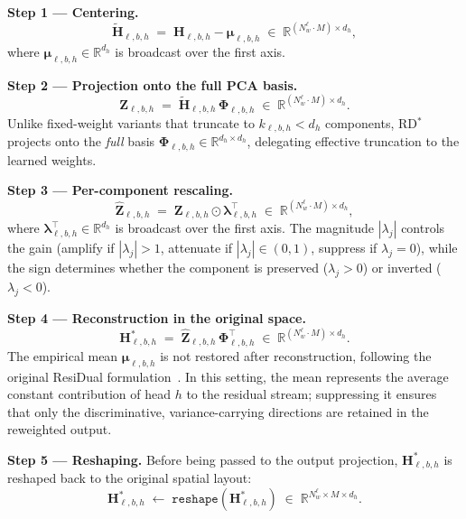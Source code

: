 \textbf{Step 1 — Centering.}
\begin{equation}
    \widetilde{\mathbf{H}}_{\ell,b,h}
\;=\; \mathbf{H}_{\ell,b,h} - \boldsymbol{\mu}_{\ell,b,h}
\;\in\; \mathbb{R}^{(N_w^\ell \cdot M) \times d_h},
\label{eq:rd_reweight-1}
\end{equation}
where $\boldsymbol{\mu}_{\ell,b,h} \in \mathbb{R}^{d_h}$ is broadcast
over the first axis.

\textbf{Step 2 — Projection onto the full PCA basis.}
\begin{equation}
    \mathbf{Z}_{\ell,b,h}
\;=\; \widetilde{\mathbf{H}}_{\ell,b,h}\,\boldsymbol{\Phi}_{\ell,b,h}
\;\in\; \mathbb{R}^{(N_w^\ell \cdot M) \times d_h}.
\label{eq:rd_reweight-2}
\end{equation}
Unlike fixed-weight variants that truncate to $k_{\ell,b,h} < d_h$
components, RD$^*$\xspace projects onto the \emph{full} basis
$\boldsymbol{\Phi}_{\ell,b,h} \in \mathbb{R}^{d_h \times d_h}$,
delegating effective truncation to the learned weights.

\textbf{Step 3 — Per-component rescaling.}
\begin{equation}
    \widehat{\mathbf{Z}}_{\ell,b,h}
\;=\; \mathbf{Z}_{\ell,b,h}
\odot \boldsymbol{\lambda}_{\ell,b,h}^\top
\;\in\; \mathbb{R}^{(N_w^\ell \cdot M) \times d_h},
\label{eq:rd_reweight-3}
\end{equation}
where $\boldsymbol{\lambda}_{\ell,b,h}^\top \in \mathbb{R}^{d_h}$ is
broadcast over the first axis. The magnitude $|\lambda_j|$ controls the gain (amplify if $|\lambda_j|>1$, 
attenuate if $|\lambda_j|\in(0,1)$, suppress if $\lambda_j=0$), while the 
sign determines whether the component is preserved ($\lambda_j>0$) or 
inverted ($\lambda_j<0$).

\textbf{Step 4 — Reconstruction in the original space.}
\begin{equation}
    \mathbf{H}^*_{\ell,b,h}
\;=\; \widehat{\mathbf{Z}}_{\ell,b,h}\,\boldsymbol{\Phi}_{\ell,b,h}^\top
\;\in\; \mathbb{R}^{(N_w^\ell \cdot M) \times d_h}.
\label{eq:reweighted_head}
\end{equation}
The empirical mean $\boldsymbol{\mu}_{\ell,b,h}$ is not restored after 
reconstruction, following the original ResiDual formulation~\cite{residual2024}. 
In this setting, the mean represents the average constant contribution of head $h$ 
to the residual stream; suppressing it ensures that only the discriminative, 
variance-carrying directions are retained in the reweighted output.

\textbf{Step 5 — Reshaping.}
Before being passed to the output projection, $\mathbf{H}^*_{\ell,b,h}$
is reshaped back to the original spatial layout:
\begin{equation}
    \mathbf{H}^*_{\ell,b,h}
\;\leftarrow\;
    \texttt{reshape}(\mathbf{H}^*_{\ell,b,h})
\;\in\; \mathbb{R}^{N_w^\ell \times M \times d_h}.
\label{eq:rd_reshape}
\end{equation}

